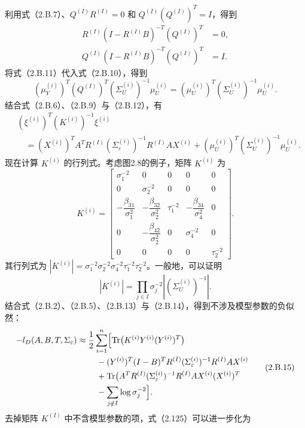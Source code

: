利用式（2.B.7）、$Q^{(I)}R^{(I)}=0$ 和 $Q^{(I)}(Q^{(I)})^T=I$，得到
\begin{equation}
\begin{aligned}
R^{(I)}(I-R^{(I)}B)^{-T}(Q^{(I)})^T&=0,\\
Q^{(I)}(I-R^{(I)}B)^{-T}(Q^{(I)})^T&=I.
\end{aligned}\tag{2.B.11}
\end{equation}
将式（2.B.11）代入式（2.B.10），得到
\begin{equation}
(\mu_Y^{(i)})^T(Q^{(I)})^T(\Sigma_U^{(i)})^{-1}\mu_U^{(i)}
 =(\mu_U^{(i)})^T(\Sigma_U^{(i)})^{-1}\mu_U^{(i)}.\tag{2.B.12}
\end{equation}
结合式（2.B.6）、（2.B.9）与（2.B.12），有
\begin{equation}
\begin{aligned}
&(\xi^{(i)})^T(K^{(i)})^{-1}\xi^{(i)}\\
&\quad=(X^{(i)})^TA^TR^{(I)}(\Sigma_\varepsilon^{(i)})^{-1}
 R^{(I)}AX^{(i)}
 +(\mu_U^{(i)})^T(\Sigma_U^{(i)})^{-1}\mu_U^{(i)}.
\end{aligned}\tag{2.B.13}
\end{equation}
现在计算 $K^{(i)}$ 的行列式。考虑图2.8的例子，矩阵 $K^{(i)}$ 为
\[
K^{(i)}=\begin{bmatrix}
\sigma_1^{-2}&0&0&0&0\\
0&\sigma_2^{-2}&0&0&0\\
-\dfrac{\beta_{31}}{\sigma_1^2}&-\dfrac{\beta_{32}}{\sigma_2^2}
 &\tau_1^{-2}&-\dfrac{\beta_{34}}{\sigma_4^2}&0\\
0&-\dfrac{\beta_{42}}{\sigma_2^2}&0&\sigma_4^{-2}&0\\
0&0&0&0&\tau_2^{-2}
\end{bmatrix}.
\]
其行列式为 $|K^{(i)}|=\sigma_1^{-2}\sigma_2^{-2}\sigma_4^{-2}\tau_1^{-2}\tau_2^{-2}$。一般地，可以证明
\begin{equation}
|K^{(i)}|=\prod_{j\in I}\sigma_j^{-2}
 \left|(\Sigma_U^{(i)})^{-1}\right|.\tag{2.B.14}
\end{equation}
结合式（2.B.2）、（2.B.5）、（2.B.13）与（2.B.14），得到不涉及模型参数的负似然：
\begin{equation}
\begin{aligned}
-l_D(A,B,T,\Sigma_\varepsilon)
 \approx{}&\frac12\sum_{i=1}^n
 \Bigl[\operatorname{Tr}\bigl(K^{(i)}Y^{(i)}(Y^{(i)})^T\bigr)\\
 &\quad-(Y^{(i)})^T(I-B)^TR^{(I)}
 (\Sigma_\varepsilon^{(i)})^{-1}R^{(I)}AX^{(i)}\\
 &\quad+\operatorname{Tr}\bigl(A^TR^{(I)}(\Sigma_\varepsilon^{(i)})^{-1}
 R^{(I)}AX^{(i)}(X^{(i)})^T\\
 &\quad-\sum_{j\notin I}\log\sigma_j^{-2}\Bigr].
\end{aligned}\tag{2.B.15}
\end{equation}
去掉矩阵 $K^{(I)}$ 中不含模型参数的项，式（2.125）可以进一步化为
